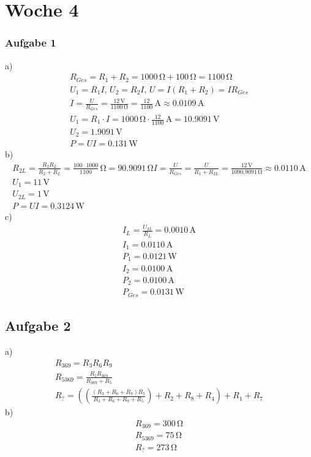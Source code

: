 \documentclass{article}
\begin{document}
\section*{Woche 4}
\subsubsection*{Aufgabe 1}
a)\begin{eqnarray*}
    R_{Ges}=R_1 + R_2 = 1000\,\mathrm{\Omega} + 100\,\mathrm{\Omega} = 1100\,\mathrm{\Omega}\\
    U_1 = R_1I,\,U_2=R_2I,\,U=I(R_1+R_2)=IR_{Ges}\\
    I = \frac{U}{R_{Ges}}=\frac{12\,\mathrm{V}}{1100\,\mathrm{\Omega}}= \frac{12}{1100}\,\mathrm{A}\approx 0.0109\,\mathrm{A}\\
    U_1 = R_1 \cdot I = 1000\,\mathrm{\Omega}\cdot \frac{12}{1100}\,\mathrm{A} = 10.9091\,\mathrm{V}\\
    U_2 = 1.9091\,\mathrm{V}\\
    P = UI = 0.131\,\mathrm{W}
\end{eqnarray*}
b)\begin{eqnarray*}
    R_{2L} = \frac{R_2R_L}{R_2+R_L}=\frac{100\cdot 1000}{1100} \,\mathrm{\Omega}=90.9091\,\mathrm{\Omega}
    I = \frac{U}{R_{Ges}} = \frac{U}{R_1+R_{2L}} = \frac{12\,\mathrm{V}}{1090.9091\,\mathrm{\Omega}} \approx 0.0110\,\mathrm{A}\\
    U_1 = 11\,\mathrm{V}\\
    U_{2L} = 1\,\mathrm{V}\\
    P = UI = 0.3124\,\mathrm{W}
\end{eqnarray*}
c)\begin{eqnarray*}
    I_L = \frac{U_{2L}}{R_L} = 0.0010\,\mathrm{A}\\
    I_1 = 0.0110\,\mathrm{A}\\
    P_1 = 0.0121\,\mathrm{W}\\
    I_2 = 0.0100\,\mathrm{A}\\
    P_2 = 0.0100\,\mathrm{A}\\
    P_{Ges} = 0.0131\,\mathrm{W}
\end{eqnarray*}

\subsection*{Aufgabe 2}
a)\begin{eqnarray*}
    R_{369} = R_3 R_6 R_9\\
    R_{5369} = \frac{R_5 R_{369}}{R_{369} + R_5}\\
    R_? = \left(\left(\frac{\left(R_3+R_6+R_9\right)R_5}{R_3+R_6+R_9+R_5}\right)+R_2+R_8+R_4\right)+R_1+R_7
\end{eqnarray*}
b)\begin{eqnarray*}
    R_{369} = 300\,\mathrm{\Omega}\\
    R_{5369} = 75\,\mathrm{\Omega}\\
    R_? = 273\,\mathrm{\Omega}
\end{eqnarray*}
\end{document}
